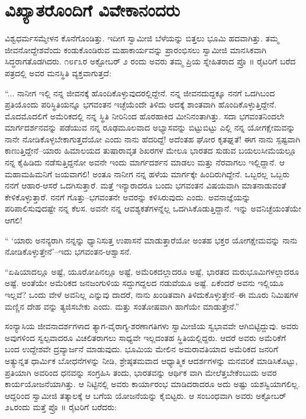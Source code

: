 
\chapter{ವಿಖ್ಯಾತರೊಂದಿಗೆ ವಿವೇಕಾನಂದರು}

\noindent

ವಿಶ್ವಧರ್ಮಸಮ್ಮೇಳನ ಕೊನೆಗೊಂಡಿತ್ತು. ಇದೀಗ ಸ್ವಾಮೀಜಿ ಬೆಳೆಯನ್ನು ಬಿತ್ತಲು ಭೂಮಿ ಹದವಾಗಿತ್ತು. ತಮ್ಮ ಜೀವನೋದ್ದೇಶವೆಂದು ಕಂಡುಕೊಂಡಿರುವ ಮಹಾಕಾರ್ಯವನ್ನು ಪ್ರಾರಂಭಿಸಲು ಸ್ವಾಮೀಜಿ ಮಾನಸಿಕವಾಗಿ ಸಿದ್ಧರಾಗತೊಡಗಿದರು. ೧೮೯೩ರ ಅಕ್ಟೋಬರ್ ೨ ರಂದು ಅವರು ತಮ್ಮ ಪ್ರಿಯ ಸ್ನೇಹಿತರಾದ ಪ್ರೊ ॥ ರೈಟರಿಗೆ ಬರೆದ ಪತ್ರದಲ್ಲಿ ಅವರ ಮನಸ್ಥಿತಿ ವ್ಯಕ್ತವಾಗುತ್ತದೆ:

“... ನಾನೀಗ ಇಲ್ಲಿ ನನ್ನ ಜೀವನಕ್ಕೆ ಹೊಂದಿಕೊಳ್ಳುವುದರಲ್ಲಿದ್ದೇನೆ. ನನ್ನ ಜೀವನದುದ್ದಕ್ಕೂ ನನಗೆ ಒದಗಿಬಂದ ಪ್ರತಿಯೊಂದು ಪರಿಸ್ಥಿತಿಯನ್ನೂ ಭಗವಂತನ ಇಚ್ಛೆಯೆಂದೇ ತಿಳಿದು ಅದಕ್ಕೆ ಶಾಂತವಾಗಿ ಹೊಂದಿಕೊಳ್ಳುತ್ತಿದ್ದೇನೆ. ಮೊದಮೊದಲಿಗೆ ಅಮೆರಿಕದಲ್ಲಿ ನನ್ನ ಸ್ಥಿತಿ ನೀರಿನಿಂದ ಹೊರಹಾಕಿದ ಮೀನಿನಂತಾಗಿತ್ತು. ಸದಾ ಭಗವಂತನಿಂದಲೇ ಮಾರ್ಗದರ್ಶನವನ್ನು ಪಡೆಯುವ ನನ್ನ ರೂಢಮೂಲವಾದ ಅಭ್ಯಾಸವನ್ನು ಬಿಟ್ಟುಬಿಟ್ಟು ಎಲ್ಲಿ ನನ್ನ ಯೋಗಕ್ಷೇಮವನ್ನು ನಾನೇ ನೋಡಿಕೊಳ್ಳಬೇಕಾಗುತ್ತದೆಯೋ ಎಂದು ನಾನು ಹೆದರಿದ್ದೆ! ಅದೆಂತಹ ಘೋರ ಕೃತಘ್ನತೆ! ಈಗ ನಾನು ಸ್ಪಷ್ಟವಾಗಿ ಕಾಣುತ್ತಿದ್ದೇನೆ–ಯಾರು ಹಿಮಾಲಯದ ತುಷಾರಾವೃತ ಶಿಖರಗಳ ಮೇಲೂ ಭಾರತದ ಸುಡುವ ಬಯಲುಸೀಮೆಯಲ್ಲೂ ನನ್ನ ಕೈಹಿಡಿದು ನಡೆಸುತ್ತಿದ್ದನೋ ಅವನೇ ಇಂದು ಮಾರ್ಗದರ್ಶನ ಮಾಡಲು ಮತ್ತು ನೆರವಾಗಲು ಇಲ್ಲಿದ್ದಾನೆ. ಆ ಮಹಾಮಹಿಮನಿಗೆ ಜಯವಾಗಲಿ! ಅಂತೂ ನಾನೀಗ ನನ್ನ ಹಳೆಯ ಮಾರ್ಗಕ್ಕೇ ಹಿಂದಿರುಗಿದ್ದೇನೆ. ಒಬ್ಬರಲ್ಲ ಒಬ್ಬರು ನನಗೆ ಆಹಾರ-ಆಸರೆ ಒದಗಿಸುತ್ತಾರೆ. ಮತ್ತೆ ಇನ್ಯಾರಾದರೂ ಬಂದು ಭಗವಂತನ ವಿಷಯವಾಗಿ ಮಾತನಾಡುವಂತೆ ಕೇಳಿಕೊಳ್ಳುತ್ತಾರೆ. ನನಗೆ ಗೊತ್ತು–ಭಗವಂತನೇ ಅವರನ್ನು ಕಳಿಸಿರುವುದು ಎಂದು. ಅವನಾಜ್ಞೆಯನ್ನು ಪರಿಪಾಲಿಸುವುದಷ್ಟೇ ನನ್ನ ಕೆಲಸ. ಅವನೇ ನನ್ನ ಆವಶ್ಯಕತೆಗಳನ್ನೆಲ್ಲ ಒದಗಿಸಿಕೊಡುತ್ತಿದ್ದಾನೆ. ಇನ್ನು ಅವನಿಚ್ಛೆಯಂತೆಯೇ ಆಗಲಿ!

“ ‘ಯಾರು ಅನನ್ಯರಾಗಿ ನನ್ನನ್ನು ಧ್ಯಾನಿಸುತ್ತ ಉಪಾಸನೆ ಮಾಡುತ್ತಾರೆಯೋ ಅಂತಹ ಭಕ್ತರ ಯೋಗಕ್ಷೇಮವನ್ನು ನಾನು ನೋಡಿಕೊಳ್ಳುತ್ತೇನೆ’–ಇದು ಭಗವಂತನ-ಆಶ್ವಾಸನೆ.

“ಏಷಿಯಾದಲ್ಲೂ ಅಷ್ಟೆ, ಯೂರೋಪಿನಲ್ಲೂ ಅಷ್ಟೆ, ಅಮೆರಿಕದಲ್ಲಾದರೂ ಅಷ್ಟೆ, ಭಾರತದ ಮರುಭೂಮಿಗಳಲ್ಲಾದರೂ ಅಷ್ಟೆ. ಅಂತೆಯೇ ಅಮೆರಿಕದ ಜನಜಂಗುಳಿಯ ಸದ್ದುಗದ್ದಲದ ನಡುವೆಯೂ ಅಷ್ಟೆ. ಏಕೆಂದರೆ ಅವನು ಇಲ್ಲಿಯೂ ಇಲ್ಲವೆ? ಒಂದು ವೇಳೆ ಅವನಿಲ್ಲ ಎನ್ನುವು ದಾದರೆ, ನಾನು ಖಂಡಿತವಾಗಿ ತಿಳಿದುಕೊಳ್ಳುತ್ತೇನೆ–ಈ ಮೂರು ನಿಮಿಷಗಳ ಮಣ್ಣಿನ ದೇಹ ವನ್ನು ತ್ಯಜಿಸಬೇಕು ಎಂದು. ಮತ್ತು ಸಂತೋಷವಾಗಿ ಹಾಗೆಯೇ ಮಾಡುತ್ತೇನೆ.”

ಸಂನ್ಯಾಸಿಯ ಜೀವನಾದರ್ಶಗಳಾದ ತ್ಯಾಗ-ವೈರಾಗ್ಯ-ಶರಣಾಗತಿಗಳು ಸ್ವಾಮೀಜಿಯ ಸ್ವಭಾವವೇ ಆಗಿಬಿಟ್ಟಿದ್ದುವು. ಅವರು ಅವುಗಳಿಂದ ಸ್ವಲ್ಪವಾದರೂ ವಿಚಲಿತರಾಗಲು ಸಾಧ್ಯವೇ ಇಲ್ಲದಂತಹ ಸ್ಥಿತಿಯಲ್ಲಿದ್ದರು. ಆದರೆ ಅವರು ಅಮೆರಿಕೆಗೆ ಬಂದ ಉದ್ದೇಶವೇ ದ್ರವ್ಯಾರ್ಜನೆ ಮಾಡುವುದು. ಭೂಮಿಯ ಮೇಲಿನ ಅಮರಾವತಿಯಾದ ಅಮೆರಿಕದ ಜನರಿಗೆ ಅತ್ಯುನ್ನತ ಧಾರ್ಮಿಕ ಬೋಧನೆಗಳನ್ನು ನೀಡಿ, ಶ್ರೇಷ್ಠತಮವಾದ ಆಧ್ಯಾತ್ಮಿಕ ಆದರ್ಶಗಳನ್ನು ಮನವರಿಕೆ ಮಾಡಿಸಿಕೊಟ್ಟು, ಪ್ರತಿಯಾಗಿ ಅವರಿಂದ ಧನವನ್ನು ಸಂಗ್ರಹಿಸಿ ತಂದು, ಭಾರತವನ್ನು ಆರ್ಥಿಕ ವಾಗಿ ಮೇಲೆತ್ತಬೇಕೆಂಬುದು ಅವರ ಕಾರ್ಯಯೋಜನೆಯಾಗಿತ್ತು. ಆ ನಿಟ್ಟಿನಲ್ಲಿ ಅವರು ಕಾರ್ಯಾರಂಭ ಮಾಡಿದರಾದರೂ ಅದು ಅಷ್ಟು ಯಶಸ್ವಿಯಾಗಲಿಲ್ಲ. ಆದ್ದರಿಂದ ಸ್ವಾಮೀಜಿ ತತ್ಕಾಲಕ್ಕೆ ಆ ಬಗೆಯ ಯೋಜನೆಯನ್ನು ಕೈಬಿಟ್ಟರು. ಆ ಸಂಬಂಧವಾಗಿ ಅವರು ಅಕ್ಟೋಬರ್ ೨೬ರಂದು ಮತ್ತೆ ಪ್ರೊ ॥ ರೈಟರಿಗೆ ಬರೆದರು:

